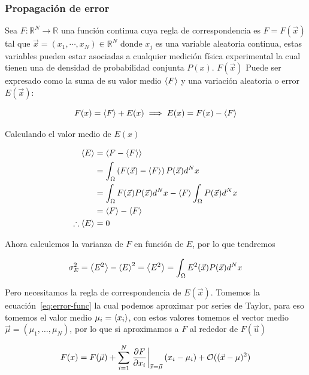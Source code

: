 \subsubsection{Propagación de error}
\label{sec:propagacion}
Sea $F: \mathbb R^N \to \mathbb R$ una función continua cuya
regla de correspondencia es $F = F(\vec{x})$
tal que $\vec{x} = (x_1, \cdots, x_N) \in \mathbb R^N$ donde $x_j$ es
una variable
aleatoria continua, estas variables pueden estar asociadas
a cualquier medición física experimental la cual tienen
una de densidad de probabilidad conjunta $P(x)$. $F(\vec{x})$
Puede ser expresado como la suma de su valor medio $\left\langle F \right\rangle$
y una variación aleatoria o error $E(\vec{x})$:

\begin{equation}
  F(x) = \left\langle F \right\rangle + E(x) \implies E(x) = F(x) - \left\langle F \right\rangle
  \label{eq:error-func}
\end{equation}

Calculando el valor medio de $E(x)$

\begin{align*}
  \left\langle E \right\rangle &= \left\langle F - \left\langle F \right\rangle \right\rangle\\
  &= \int_\Omega \left(F(\vec{x}) - \left\langle F \right\rangle\right)P(\vec{x})d^Nx\\
  &= \int_\Omega F(\vec{x})P(\vec{x})d^Nx
  - \left\langle F \right\rangle\int_\Omega P(\vec{x})d^Nx\\
  &=\left\langle F \right\rangle - \left\langle F \right\rangle \\
  \therefore \left\langle E \right\rangle &= 0
\end{align*}

Ahora calculemos la varianza de $F$ en función de $E$,
por lo que tendremos

\begin{equation}
  \sigma_E^2 = \left\langle E^2 \right\rangle - \left\langle E \right\rangle^2 = \left\langle E^2 \right\rangle = \int_\Omega
  E^2(\vec{x}) P(\vec{x}) d^Nx
  \label{eq:medition-variance}
\end{equation}

Pero necesitamos la regla de correspondencia de $E(\vec{x})$.
Tomemos la ecuación~\ref{eq:error-func} la cual
podemos aproximar por series de Taylor, para eso tomemos el valor
medio $\mu_i = \left\langle x_i \right\rangle$,
con estos valores tomemos el vector medio $\vec{\mu} = (\mu_1, \dots, \mu_N)$,
por lo que si aproximamos a $F$ al rededor de $F(\vec{u})$

\begin{equation}
  F(x) = F(\vec\mu) + \sum_{i = 1}^N \left.\frac{\partial F}{\partial x_i}\right|_{\vec x = \vec\mu} (x_i - \mu_i) +
  \mathcal{O}((\vec{x}-\mu)^2)
  \label{eq:taylor-f-aprox}
\end{equation}


